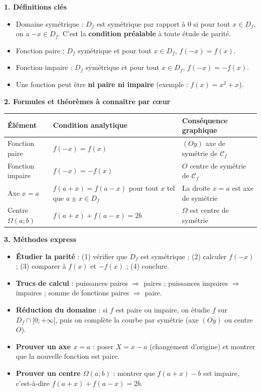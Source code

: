 \documentclass[11pt]{article}
\newcommand{\cle}[1]{{\popxbold\color{popdark}#1}}
\begin{document}
\begin{bilan}
\textbf{1. Définitions clés}
\begin{itemize}
  \item \cle{Domaine symétrique} : $D_f$ est symétrique par rapport à $0$ si pour tout $x\in D_f$, on a $-x\in D_f$. C'est la \textbf{condition préalable} à toute étude de parité.
  \item \cle{Fonction paire} : $D_f$ symétrique et pour tout $x\in D_f$, $f(-x)=f(x)$.
  \item \cle{Fonction impaire} : $D_f$ symétrique et pour tout $x\in D_f$, $f(-x)=-f(x)$.
  \item Une fonction peut être \textbf{ni paire ni impaire} (exemple : $f(x)=x^2+x$).
\end{itemize}

\textbf{2. Formules et théorèmes à connaître par c\oe ur}
\begin{center}
\begin{tabularx}{\linewidth}{|l|X|X|}
\hline
\rowcolor{popblueL} \textbf{Élément} & \textbf{Condition analytique} & \textbf{Conséquence graphique} \\
\hline
Fonction paire & $f(-x)=f(x)$ & $(Oy)$ axe de symétrie de $\mathcal{C}_f$ \\
\hline
Fonction impaire & $f(-x)=-f(x)$ & $O$ centre de symétrie de $\mathcal{C}_f$ \\
\hline
Axe $x=a$ & $f(a+x)=f(a-x)$ pour tout $x$ tel que $a\pm x\in D_f$ & La droite $x=a$ est axe de symétrie \\
\hline
Centre $\Omega(a;b)$ & $f(a+x)+f(a-x)=2b$ & $\Omega$ est centre de symétrie \\
\hline
\end{tabularx}
\end{center}

\textbf{3. Méthodes express}
\begin{itemize}
  \item \textbf{Étudier la parité} : (1) vérifier que $D_f$ est symétrique ; (2) calculer $f(-x)$ ; (3) comparer à $f(x)$ et $-f(x)$ ; (4) conclure.
  \item \textbf{Trucs de calcul} : puissances paires $\Rightarrow$ paires ; puissances impaires $\Rightarrow$ impaires ; somme de fonctions paires $\Rightarrow$ paire.
  \item \textbf{Réduction du domaine} : si $f$ est paire ou impaire, on étudie $f$ sur $D_f\cap[0;+\infty[$, puis on complète la courbe par symétrie (axe $(Oy)$ ou centre $O$).
  \item \textbf{Prouver un axe $x=a$} : poser $X=x-a$ (changement d'origine) et montrer que la nouvelle fonction est paire.
  \item \textbf{Prouver un centre $\Omega(a;b)$} : montrer que $f(a+x)-b$ est impaire, c'est-à-dire $f(a+x)+f(a-x)=2b$.
\end{itemize}
\end{bilan}
\end{document}
